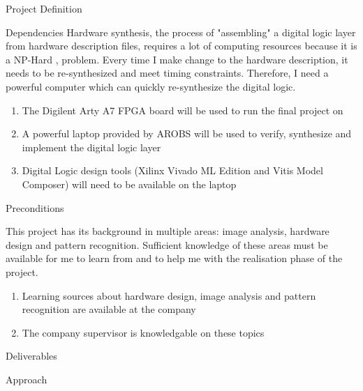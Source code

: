\documentclass{matthijs}
\begin{document}
\begin{hoofdstuk}{Project Definition}
\begin{paragraaf}{Dependencies}
			Hardware synthesis, the process of "assembling" a digital logic layer from hardware description files, requires a lot of computing resources because it is a NP-Hard \cite{chu2006rtl}, problem.
			Every time I make change to the hardware description, it needs to be re-synthesized and meet timing constraints.
			Therefore, I need a powerful computer which can quickly re-synthesize the digital logic.

			\begin{enumerate}

				\item The Digilent Arty A7 FPGA board will be used to run the final project on
				\item A powerful laptop provided by AROBS will be used to verify, synthesize and implement the digital logic layer
				\item Digital Logic design tools (Xilinx Vivado ML Edition and Vitis Model Composer) will need to be available on the laptop
		
			\end{enumerate}

		\end{paragraaf}

		\begin{paragraaf}{Preconditions}

			This project has its background in multiple areas: image analysis, hardware design and pattern recognition.
			Sufficient knowledge of these areas must be available for me to learn from and to help me with the realisation phase of the project.

			\begin{enumerate}

				\item Learning sources about hardware design, image analysis and pattern recognition are available at the company
				\item The company supervisor is knowledgable on these topics

			\end{enumerate}

		\end{paragraaf}

	\end{hoofdstuk}

	\begin{hoofdstuk}{Deliverables}

	\end{hoofdstuk}

	\begin{hoofdstuk}{Approach}

	\end{hoofdstuk}
\end{document}
